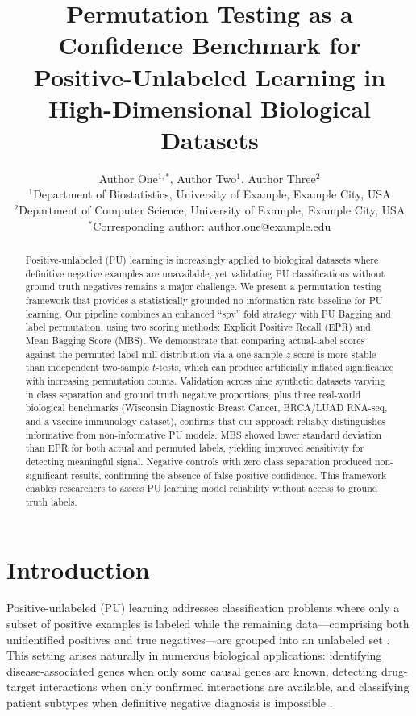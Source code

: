\documentclass[12pt]{article}
\title{Permutation Testing as a Confidence Benchmark for Positive-Unlabeled Learning in High-Dimensional Biological Datasets}
\author{Author One$^{1,*}$, Author Two$^{1}$, Author Three$^{2}$ \\
\small $^1$Department of Biostatistics, University of Example, Example City, USA \\
\small $^2$Department of Computer Science, University of Example, Example City, USA \\
\small $^*$Corresponding author: author.one@example.edu}
\date{}
\begin{document}
\maketitle

\begin{abstract}
Positive-unlabeled (PU) learning is increasingly applied to biological datasets where definitive negative examples are unavailable, yet validating PU classifications without ground truth negatives remains a major challenge. We present a permutation testing framework that provides a statistically grounded no-information-rate baseline for PU learning. Our pipeline combines an enhanced ``spy'' fold strategy with PU Bagging and label permutation, using two scoring methods: Explicit Positive Recall (EPR) and Mean Bagging Score (MBS). We demonstrate that comparing actual-label scores against the permuted-label null distribution via a one-sample $z$-score is more stable than independent two-sample $t$-tests, which can produce artificially inflated significance with increasing permutation counts. Validation across nine synthetic datasets varying in class separation and ground truth negative proportions, plus three real-world biological benchmarks (Wisconsin Diagnostic Breast Cancer, BRCA/LUAD RNA-seq, and a vaccine immunology dataset), confirms that our approach reliably distinguishes informative from non-informative PU models. MBS showed lower standard deviation than EPR for both actual and permuted labels, yielding improved sensitivity for detecting meaningful signal. Negative controls with zero class separation produced non-significant results, confirming the absence of false positive confidence. This framework enables researchers to assess PU learning model reliability without access to ground truth labels.
\end{abstract}

\section{Introduction}

Positive-unlabeled (PU) learning addresses classification problems where only a subset of positive examples is labeled while the remaining data---comprising both unidentified positives and true negatives---are grouped into an unlabeled set \citep{bekker2020learning}. This setting arises naturally in numerous biological applications: identifying disease-associated genes when only some causal genes are known, detecting drug-target interactions when only confirmed interactions are available, and classifying patient subtypes when definitive negative diagnosis is impossible \citep{elkan2008learning, liu2003building}.
\end{document}
